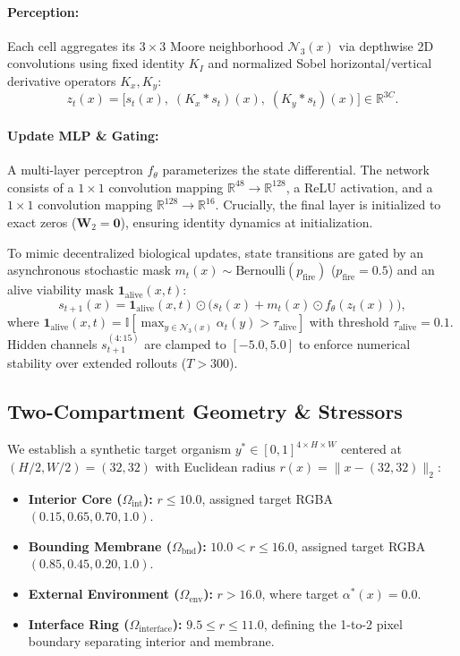 \documentclass[10pt,twocolumn]{article}
\begin{document}
\paragraph{Perception:} Each cell aggregates its $3 \times 3$ Moore neighborhood $\mathcal{N}_3(x)$ via depthwise 2D convolutions using fixed identity $K_I$ and normalized Sobel horizontal/vertical derivative operators $K_x, K_y$:
\begin{equation}
z_t(x) = \big[ s_t(x),\; (K_x * s_t)(x),\; (K_y * s_t)(x) \big] \in \mathbb{R}^{3C}.
\end{equation}

\paragraph{Update MLP \& Gating:} A multi-layer perceptron $f_\theta$ parameterizes the state differential. The network consists of a $1 \times 1$ convolution mapping $\mathbb{R}^{48} \to \mathbb{R}^{128}$, a ReLU activation, and a $1 \times 1$ convolution mapping $\mathbb{R}^{128} \to \mathbb{R}^{16}$. Crucially, the final layer is initialized to exact zeros ($\mathbf{W}_2 = \mathbf{0}$), ensuring identity dynamics at initialization. 

To mimic decentralized biological updates, state transitions are gated by an asynchronous stochastic mask $m_t(x) \sim \text{Bernoulli}(p_{\text{fire}})$ ($p_{\text{fire}} = 0.5$) and an alive viability mask $\mathbf{1}_{\text{alive}}(x, t)$:
\begin{equation}
s_{t+1}(x) = \mathbf{1}_{\text{alive}}(x, t) \odot \Big( s_t(x) + m_t(x) \odot f_\theta(z_t(x)) \Big),
\end{equation}
where $\mathbf{1}_{\text{alive}}(x, t) = \mathbb{I}[\max_{y \in \mathcal{N}_3(x)} \alpha_t(y) > \tau_{\text{alive}}]$ with threshold $\tau_{\text{alive}} = 0.1$. Hidden channels $s_{t+1}^{(4:15)}$ are clamped to $[-5.0, 5.0]$ to enforce numerical stability over extended rollouts ($T > 300$).

\subsection{Two-Compartment Geometry \& Stressors}

We establish a synthetic target organism $y^* \in [0, 1]^{4 \times H \times W}$ centered at $(H/2, W/2) = (32, 32)$ with Euclidean radius $r(x) = \|x - (32, 32)\|_2$:
\begin{itemize}\setlength{\itemsep}{1pt}\setlength{\parskip}{0pt}
    \item \textbf{Interior Core ($\Omega_{\text{int}}$):} $r \le 10.0$, assigned target RGBA $(0.15, 0.65, 0.70, 1.0)$.
    \item \textbf{Bounding Membrane ($\Omega_{\text{bnd}}$):} $10.0 < r \le 16.0$, assigned target RGBA $(0.85, 0.45, 0.20, 1.0)$.
    \item \textbf{External Environment ($\Omega_{\text{env}}$):} $r > 16.0$, where target $\alpha^*(x) = 0.0$.
    \item \textbf{Interface Ring ($\Omega_{\text{interface}}$):} $9.5 \le r \le 11.0$, defining the 1-to-2 pixel boundary separating interior and membrane.
\end{itemize}
\end{document}
